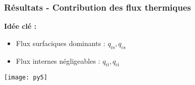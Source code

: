 \documentclass[handout]{beamer}
\newtheorem{pbm et hypo}[thm]{Problématique et hypothèses}
\begin{document}
	
	\begin{frame}
		\frametitle{Résultats - Contribution des flux thermiques}
		
		\textbf{Idée clé :} 
		\begin{itemize}
			\item Flux surfaciques dominants : $q_{\text{rs}}, q_{\text{cs}}$
			\item Flux internes négligeables : $q_{\text{ri}}, q_{\text{ci}}$
		\end{itemize}
		
		\pause
		\begin{center}
			\texttt{[image: py5]}
		\end{center}
	\end{frame}
	
\end{document}
